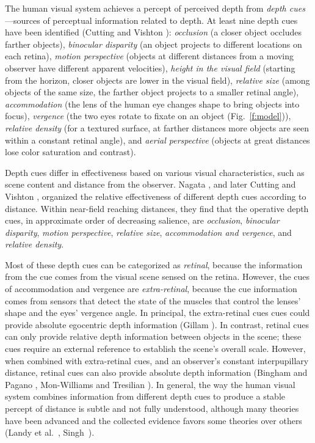 \documentclass[10pt,journal,compsoc]{IEEEtran}
\makeatletter
\newcommand{\etal}{et al.\@\xspace} %
\makeatother
\begin{document}
The human visual system achieves a percept of perceived depth from \emph{depth cues}---sources of perceptual information related to depth.  At least nine depth cues have been identified (Cutting and Vishton \cite{cutting:1995}): 
\emph{occlusion} (a closer object occludes farther objects), 
\emph{binocular disparity} (an object projects to different locations on each retina), 
\emph{motion perspective} (objects at different distances from a moving observer have different apparent velocities), 
\emph{height in the visual field} (starting from the horizon, closer objects are lower in the visual field), 
\emph{relative size} (among objects of the same size, the farther object projects to a smaller retinal angle), 
\emph{accommodation} (the lens of the human eye changes shape to bring objects into focus), 
\emph{vergence} (the two eyes rotate to fixate on an object (Fig.~\ref{f:model})), 
\emph{relative density} (for a textured surface, at farther distances more objects are seen within a constant retinal angle), and
\emph{aerial perspective} (objects at great distances lose color saturation and contrast).

Depth cues differ in effectiveness based on various visual characteristics, such as scene content and distance from the observer.  Nagata \cite{nagata:1991}, and later Cutting and Vishton \cite{cutting:1995}, organized the relative effectiveness of different depth cues according to distance.  Within near-field reaching distances, they find that the operative depth cues, in approximate order of decreasing salience, are 
\emph{occlusion}, 
\emph{binocular disparity}, 
\emph{motion perspective}, 
\emph{relative size},  
\emph{accommodation and vergence}, and 
\emph{relative density}. 

Most of these depth cues can be categorized as \emph{retinal}, because the information from the cue comes from the visual scene sensed on the retina.  However, the cues of accommodation and vergence are \emph{extra-retinal}, because the cue information comes from sensors that detect the state of the muscles that control the lenses' shape and the eyes' vergence angle.  In principal, the extra-retinal cues cues could provide absolute egocentric depth information (Gillam \cite{gillam:1995}).  In contrast, retinal cues can only provide relative depth information between objects in the scene; these cues require an external reference to establish the scene's overall scale.  However, when combined with extra-retinal cues, and an observer's constant interpupillary distance, retinal cues can also provide absolute depth information (Bingham and Pagano \cite{bingham:1998}, Mon-Williams and Tresilian \cite{monwilliams:1999}).  In general, the way the human visual system combines information from different depth cues to produce a stable percept of distance is subtle and not fully understood, although many theories have been advanced and the collected evidence favors some theories over others (Landy \etal~\cite{landy:1995}, Singh~\cite{singh:2013}).
\end{document}
